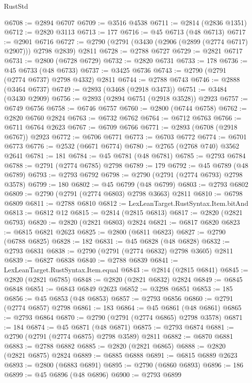 \begin{lexlean}{RustStd}
\begin{coremodule}
@6708 := @2894 @6707
@6709 := @3516 @4538
@6711 := @2814 (@2836 @1351)
@6712 := @2820 @3113
@6713 := 177
@6716 := @45 @6713 (@48 @6713)
@6717 := @2901 @6716
@6727 := @2790 (@2791 (@3430 (@2906 (@2899 (@2774 @6717) @2907))) @2798 @2839) @2811
@6728 := @2788 @6727
@6729 := @2821 @6717
@6731 := @2800 (@6728 @6729)
@6732 := @2820 @6731
@6733 := 178
@6736 := @45 @6733 (@48 @6733)
@6737 := @3425 @6736
@6743 := @2790 (@2791 (@2774 @6737) @2798 @4332) @2811
@6744 := @2788 @6743
@6746 := @2888 (@3464 @6737)
@6749 := @2893 (@3468 (@2918 @3473))
@6751 := @3484 (@3430 @2909)
@6756 := @2893 (@2894 @6751 (@2918 @3528)) @2923
@6757 := @6749 @6756
@6758 := @6746 @6757
@6760 := @2800 (@6744 @6758)
@6762 := @2820 @6760 @2824
@6763 := @6732 @6762
@6764 := @6712 @6763
@6766 := @6711 @6764 @2623
@6767 := @6709 @6766
@6771 := @2893 (@6708 (@2918 @6767)) @2923
@6772 := @6706 @6771
@6773 := @6703 @6772
@6774 := @6701 @6773
@6776 := @2532 (@6671 @6774)
@6780 := @2765 (@2768 @740) @3562 @2641
@6781 := 181
@6784 := @45 @6781 (@48 @6781)
@6785 := @2793 @6784
@6788 := @2791 (@2774 @6785) @2798
@6789 := 179
@6792 := @45 @6789 (@48 @6789)
@6793 := @2793 @6792
@6798 := @2790 (@2791 (@2774 @6793) @2798 @3578)
@6799 := 180
@6802 := @45 @6799 (@48 @6799)
@6803 := @2793 @6802
@6809 := @2790 (@2791 (@2774 @6803) @2798 @3663) @2811
@6810 := @6798 @6809
@6811 := @2788 @6810
@6812 := LexLeanTarget.RustSyntax.Item.bitAnd
@6813 := @6812 @12
@6815 := @2814 (@2815 @6813)
@6817 := @2820 (@2821 @6793)
@6820 := @2820 (@2821 @6803) @2824
@6821 := @6817 @6820
@6823 := @6815 @6821 @2623
@6825 := @2800 (@6811 @6823)
@6827 := @2790 (@6788 @6825)
@6828 := 182
@6831 := @45 @6828 (@48 @6828)
@6832 := @2793 @6831
@6838 := @2790 (@2791 (@2774 @6832) @2798 @3605) @2811
@6839 := @6827 @6838
@6840 := @2788 @6839
@6841 := LexLeanTarget.RustSyntax.Item.equal
@6843 := @2814 (@2815 @6841)
@6845 := @2820 (@2821 @6785)
@6848 := @2820 (@2821 @6832) @2824
@6849 := @6845 @6848
@6851 := @6843 @6849 @2623
@6852 := @3298 @6851
@6853 := 185
@6856 := @45 @6853 (@48 @6853)
@6857 := @2793 @6856
@6860 := @2791 (@2774 @6857) @2798
@6861 := 183
@6864 := @45 @6861 (@48 @6861)
@6865 := @2793 @6864
@6870 := @2790 (@2791 (@2774 @6865) @2798 @3578)
@6871 := 184
@6874 := @45 @6871 (@48 @6871)
@6875 := @2793 @6874
@6881 := @2790 (@2791 (@2774 @6875) @2798 @3589) @2811
@6882 := @6870 @6881
@6883 := @2788 @6882
@6885 := @2820 (@2821 @6865)
@6888 := @2820 (@2821 @6875) @2824
@6889 := @6885 @6888
@6891 := @6815 @6889 @2623
@6893 := @2800 (@6883 @6891)
@6895 := @2790 (@6860 @6893)
@6896 := 186
@6899 := @45 @6896 (@48 @6896)
@6900 := @2793 @6899

\end{coremodule}
\end{lexlean}
